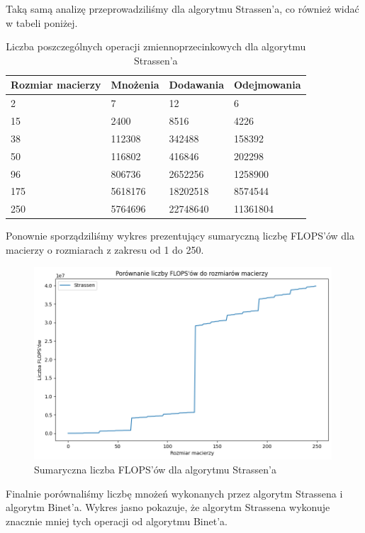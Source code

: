 \documentclass{article}
\begin{document}
\noindent
Taką samą analizę przeprowadziliśmy dla algorytmu Strassen'a, co również widać w tabeli poniżej.

\begin{table}[H]
    \centering
    \begin{tabular}{|l|l|l|l|}
    \hline
        Rozmiar macierzy & Mnożenia & Dodawania & Odejmowania \\ \hline
        2 & 7 & 12 & 6  \\ \hline
        15 & 2400 & 8516 & 4226  \\ \hline
        38 & 112308 & 342488 & 158392  \\ \hline
        50 & 116802 & 416846 & 202298  \\ \hline
        96 & 806736 & 2652256 & 1258900  \\ \hline
        175 & 5618176 & 18202518 & 8574544  \\ \hline
        250 & 5764696 & 22748640 & 11361804 \\ \hline
    \end{tabular}
    \caption{Liczba poszczególnych operacji zmiennoprzecinkowych dla algorytmu Strassen'a}
\end{table}

\noindent
Ponownie sporządziliśmy wykres prezentujący sumaryczną liczbę FLOPS'ów dla macierzy o rozmiarach z zakresu od 1 do 250.

\begin{figure}[H]
  \centering
    \includegraphics[width=0.99\textwidth]{images/strassen_flops.png}
  \caption{Sumaryczna liczba FLOPS'ów dla algorytmu Strassen'a}
\end{figure}

\noindent
Finalnie porównaliśmy liczbę mnożeń wykonanych przez algorytm Strassena i algorytm Binet'a. Wykres jasno pokazuje, że algorytm Strassena wykonuje znacznie mniej tych operacji od algorytmu Binet'a.
\end{document}
